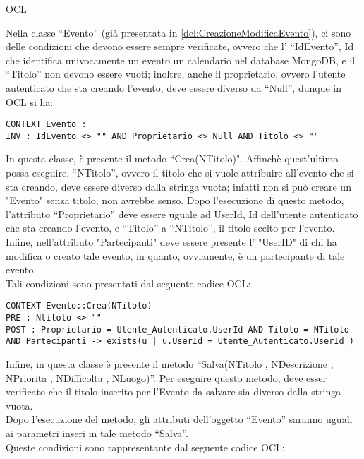 \begin{listaPersonale}{OCL}
    \begin{center}
        
    \end{center}
    Nella classe “Evento” (già presentata in \ref{dcl:CreazioneModificaEvento}), ci sono delle condizioni che devono essere sempre verificate, ovvero che l' “IdEvento”, Id che identifica univocamente un evento un calendario nel database MongoDB, e il “Titolo” non devono essere vuoti; inoltre, anche il proprietario, ovvero l'utente autenticato che sta creando l'evento, deve essere diverso da “Null”, dunque in OCL si ha:
    \begin{lstlisting}
CONTEXT Evento :
INV : IdEvento <> "" AND Proprietario <> Null AND Titolo <> ""
    \end{lstlisting}
    In questa classe, è presente il metodo “Crea(NTitolo)". Affinchè quest'ultimo possa eseguire, “NTitolo”, ovvero il titolo che si vuole attribuire all'evento che si sta creando, deve essere diverso dalla stringa vuota; infatti non si può creare un "Evento" senza titolo, non avrebbe senso. Dopo l'esecuzione di questo metodo, l'attributo “Proprietario” deve essere uguale ad UserId, Id dell'utente autenticato che sta creando l'evento, e “Titolo” a “NTitolo”, il titolo scelto per l'evento. Infine, nell'attributo "Partecipanti" deve essere presente l' "UserID" di chi ha modifica o creato tale evento, in quanto, ovviamente, è un partecipante di tale evento. \\
    Tali condizioni sono presentati dal seguente codice OCL:
    \begin{lstlisting}
CONTEXT Evento::Crea(NTitolo)
PRE : Ntitolo <> ""
POST : Proprietario = Utente_Autenticato.UserId AND Titolo = NTitolo AND Partecipanti -> exists(u | u.UserId = Utente_Autenticato.UserId )
    \end{lstlisting}
    Infine, in questa classe è presente il metodo “Salva(NTitolo , NDescrizione , NPriorita , NDifficolta , NLuogo)”. Per eseguire questo metodo, deve esser verificato che il titolo inserito per l'Evento da salvare sia diverso dalla stringa vuota. \\
    Dopo l'esecuzione del metodo, gli attributi dell'oggetto “Evento” saranno uguali ai parametri inseri in tale metodo “Salva”. \\
    Queste condizioni sono rappresentante dal seguente codice OCL:


\end{listaPersonale}
